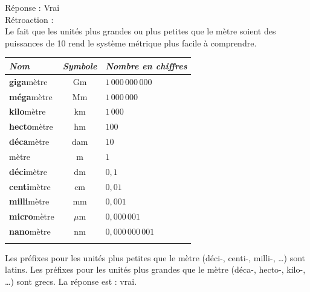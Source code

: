 \documentclass[letterpaper, 12pt]{article}
\begin{document}
R\'eponse : Vrai\\

R\'etroaction :\\
Le fait que les unit\'es plus grandes ou plus petites que le m\`etre soient des puissances de 10 rend le syst\`eme m\'etrique plus facile \`a comprendre.\\

\begin{center}
\begin{tabular}{|l|c|l|} \hline
{\it Nom} & {\it Symbole} & {\it Nombre en chiffres}  \\ \hline \hline
\textbf{giga}m\`etre & Gm & $1 \, 000 \, 000 \, 000$\\ \hline
\textbf{m\'ega}m\`etre & Mm & $1 \, 000 \, 000$\\ \hline
\textbf{kilo}m\`etre & km & $1 \, 000$\\ \hline
\textbf{hecto}m\`etre & hm & $100$\\ \hline
\textbf{d\'eca}m\`etre & dam & $10$\\ \hline
m\`etre & m & $1$\\ \hline
\textbf{d\'eci}m\`etre & dm & $0,1$\\ \hline
\textbf{centi}m\`etre & cm & $0,01$\\ \hline
\textbf{milli}m\`etre & mm & $0,001$\\ \hline
\textbf{micro}m\`etre & $\mu$m & $0,000 \, 001$\\ \hline
\textbf{nano}m\`etre & nm & $0,000 \, 000 \, 001$\\ \hline
\multicolumn{3}{c}{}\\
\end{tabular}
\end{center}

Les pr\'efixes pour les unit\'es plus petites que le m\`etre (d\'eci-, centi-, milli-, \dots) sont latins. Les pr\'efixes pour les unit\'es plus grandes que le m\`etre (d\'eca-, hecto-, kilo-, \dots) sont grecs. La r\'eponse est : vrai.\\
\end{document}
